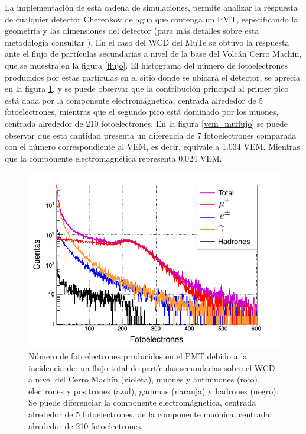 \documentclass[12pt,oneside,openany,letter]{book}
\begin{document}
La implementaci\'on de esta cadena de simulaciones, permite analizar la respuesta de cualquier detector Cherenkov de agua que contenga un PMT, especificando la geometr\'ia y las dimensiones del detector (para m\'as detalles sobre esta metodolog\'ia consultar \cite{JaimesMotta2018}). En el caso del WCD del MuTe se obtuvo la respuesta ante el flujo de partículas secundarias a nivel de la base del Volc\'an Cerro Mach\'in, que se muestra en la figura \ref{flujo}. El histograma del número de fotoelectrones producidos por estas partículas en el sitio donde se ubicará el detector, se aprecia en la figura \ref{fotoelec_flujo}, y se puede observar que la contribución principal al primer pico está dada por la componente electromágnetica, centrada alrededor de 5 fotoelectrones, mientras que el segundo pico está dominado por los muones, centrada alrededor de 210 fotoelectrones. En la figura \ref{vem_muflujo} se puede observar que esta cantidad presenta un diferencia de 7 fotoelectrones comparada con el n\'umero correspondiente al VEM, es decir, equivale a 1.034 VEM. Mientras que la componente electromagn\'etica representa 0.024 VEM.



\begin{figure}[h]
\centering
\includegraphics[scale=0.4]{images/fotoelec_flujo.png}
\caption[Número de fotoelectrones producidos debido a la incidencia del flujo total de partículas secundarias sobre el WCD a nivel del Cerro Machín]{Número de fotoelectrones producidos en el PMT debido a la incidencia de: un flujo total de partículas secundarias sobre el WCD a nivel del Cerro Machín (violeta), muones y antimuones (rojo), electrones y positrones (azul), gammas (naranja) y hadrones (negro). Se puede diferenciar la componente electromágnetica, centrada alrededor de 5 fotoelectrones, de la componente muónica, centrada alrededor de 210 fotoelectrones. 
\label{fotoelec_flujo}}
\end{figure}
\end{document}
